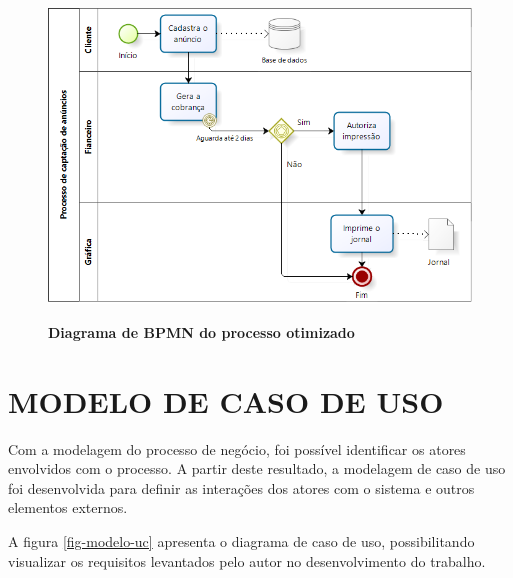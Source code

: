 \documentclass[
	12pt,				%
	openright,			%
	oneside,			%
	a4paper,			%
	chapter=TITLE,		%
	section=TITLE,		%
	english,			%
	french,				%
	spanish,			%
	brazil				%
	]{abntex2}
\begin{document}
\begin{figure}[h]
	\begin{center}
		\caption{
			\textbf{Diagrama de BPMN do processo otimizado}
		}\label{fig-bpmn-processo-otimizado}
		\includegraphics [scale=0.84]{imagens/bpmn_processo_otimizado.png}
		\label{fig-bpmn-processo-otimizado}
	\end{center}
\end{figure}

\section{MODELO DE CASO DE USO}
Com a modelagem do processo de negócio, foi possível identificar os atores envolvidos com o processo. A partir deste resultado, a modelagem de caso de uso foi desenvolvida para definir as interações dos atores com o sistema e outros elementos externos.

A figura \ref{fig-modelo-uc} apresenta o diagrama de caso de uso, possibilitando visualizar os requisitos levantados pelo autor no desenvolvimento do trabalho. \\ \\ \\ \\ \\ \\ \\ \\ \\ \\
\end{document}
